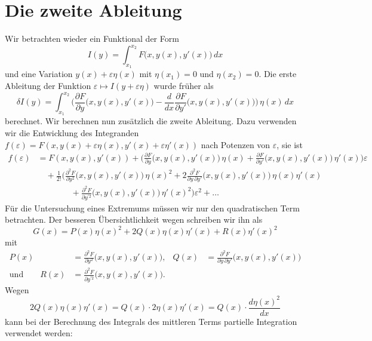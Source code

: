 %
%
%
\section{Die zweite Ableitung
\label{buch:variation2:section:zweiteableitung}}
Wir betrachten wieder ein Funktional der Form
\[
I(y)
=
\int_{x_1}^{x_2}
F\bigl(x,y(x),y'(x)\bigr)
\,dx
\]
und eine Variation $y(x)+\varepsilon\eta(x)$ mit $\eta(x_1)=0$
und $\eta(x_2)=0$.
Die erste Ableitung der Funktion $\varepsilon\mapsto I(y+\varepsilon\eta)$
wurde früher als
\[
\delta I(y)
=
\int_{x_1}^{x_2}
\biggl(
\frac{\partial F}{\partial y}\bigl(x,y(x),y'(x)\bigr)
-
\frac{d}{dx}
\frac{\partial F}{\partial y'}\bigl(x,y(x),y'(x)\bigr)
\biggr)
\,
\eta(x)
\,dx
\]
berechnet.
Wir berechnen nun zusätzlich die zweite Ableitung.
Dazu verwenden wir die Entwicklung des Integranden
$f(\varepsilon) = F(x,y(x)+\varepsilon\eta(x),y'(x)+\varepsilon\eta'(x))$
nach Potenzen von $\varepsilon$, sie ist
\begin{align*}
f(\varepsilon)
&=
F(x,y(x),y'(x))
+
\biggl(
\frac{\partial F}{\partial y}\bigl(x,y(x),y'(x)\bigr)\,\eta(x)
+
\frac{\partial F}{\partial y'}\bigl(x,y(x),y'(x)\bigr)\,\eta'(x)
\biggr)
\varepsilon
\\
&\quad
+
\frac{1}{2!}
\biggl(
\frac{\partial^2 F}{\partial y^2}\bigl(x,y(x),y'(x)\bigr)
\,
\eta(x)^2
+
2
\frac{\partial^2 F}{\partial y\,\partial y'}\bigl(x,y(x),y'(x)\bigr)
\,
\eta(x)\eta'(x)
\\
&\qquad\qquad
+
\frac{\partial^2 F}{\partial y^{\prime 2}}\bigl(x,y(x),y'(x)\bigr)
\,
\eta'(x)^2
\biggr)
\varepsilon^2
+
\dots
\end{align*}
Für die Untersuchung eines Extremums müssen wir nur den quadratischen
Term betrachten.
Der besseren Übersichtlichkeit wegen schreiben wir ihn als
\[
G(x)
=
P(x)\eta(x)^2 + 2Q(x) \eta(x)\eta'(x) + R(x)\eta'(x)^2
\]
mit
\begin{align*}
P(x) &= \frac{\partial^2 F}{\partial y^2} \bigl(x,y(x),y'(x)\bigr),
&
Q(x) &= \frac{\partial^2 F}{\partial y\,\partial y'} \bigl(x,y(x),y'(x)\bigr)
\\
\text{und}
\qquad
R(x) &= \frac{\partial^2 F}{\partial y^{\prime 2}} \bigl(x,y(x),y'(x)\bigr).
\end{align*}
Wegen
\[
2Q(x)\eta(x)\eta'(x)
=
Q(x)\cdot 2\eta(x)\eta'(x)
=
Q(x)\cdot \frac{d\eta(x)^2}{dx}
\]
kann bei der Berechnung des Integrals des mittleren Terms partielle
Integration verwendet werden:
